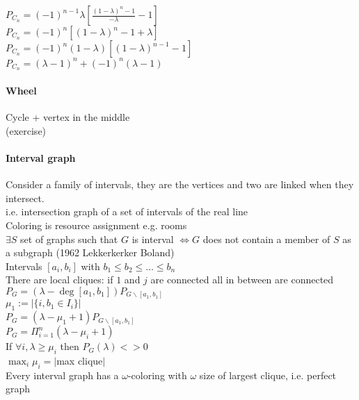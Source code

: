 \documentclass[12pt]{article}
\begin{document}
$P_{C_n} = (-1)^{n-1} \lambda \left[ \frac{(1-\lambda)^n - 1}{- \lambda} - 1 \right]$\\
$P_{C_n} = (-1)^{n} \left[ (1-\lambda)^n - 1 + \lambda \right]$\\
$P_{C_n} = (-1)^n (1 - \lambda) [ (1 - \lambda)^{n-1} - 1 ]$\\
$P_{C_n} = (\lambda - 1)^n + (-1)^n (\lambda - 1)$\\

\paragraph{Wheel\\}
Cycle + vertex in the middle\\
(exercise)\\

\paragraph{Interval graph\\}
Consider a family of intervals, they are the vertices and two are linked when they intersect.\\
i.e. intersection graph of a set of intervals of the real line\\
Coloring is resource assignment e.g. rooms\\
$\exists S$ set of graphs such that $G$ is interval $\Leftrightarrow G$ does not contain a member of $S$ as a subgraph (1962 Lekkerkerker Boland)\\

Intervals $[a_i, b_i]$ with $b_1 \leqslant b_2 \leqslant ... \leqslant b_n$\\
There are local cliques: if $1$ and $j$ are connected all in between are connected\\
$P_G = (\lambda - \deg [a_1, b_1]) P_{G \backslash [a_1,b_1]}$\\
$\mu_1 := |\{i, b_1 \in I_i\}|$\\
$P_G = (\lambda - \mu_1 +1) P_{G \backslash [a_1,b_1]}$\\
$P_G = \Pi_{i=1}^n (\lambda - \mu_i + 1)$\\
If $\forall i, \lambda  \geqslant \mu_i$ then $P_G(\lambda) <> 0$\\
$\max_i \mu_i = |$max clique$|$\\
Every interval graph has a $\omega$-coloring with $\omega$ size of largest clique, i.e. perfect graph\\
\end{document}
